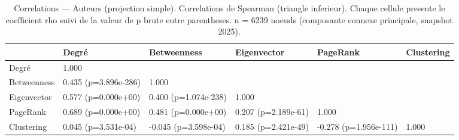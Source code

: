 \begin{table}
\caption{Correlations — Auteurs (projection simple). Correlations de Spearman (triangle inferieur). Chaque cellule presente le coefficient rho suivi de la valeur de p brute entre parentheses. n = 6239 noeuds (composante connexe principale, snapshot 2025).}
\label{tab:corr_heatmap_corr_auteurs_simple}
\begin{tabular}{llllll}
\toprule
 & Degré & Betweenness & Eigenvector & PageRank & Clustering \\
\midrule
Degré & 1.000 &  &  &  &  \\
Betweenness & 0.435
(p=3.896e-286) & 1.000 &  &  &  \\
Eigenvector & 0.577
(p=0.000e+00) & 0.400
(p=1.074e-238) & 1.000 &  &  \\
PageRank & 0.689
(p=0.000e+00) & 0.481
(p=0.000e+00) & 0.207
(p=2.189e-61) & 1.000 &  \\
Clustering & 0.045
(p=3.531e-04) & -0.045
(p=3.598e-04) & 0.185
(p=2.421e-49) & -0.278
(p=1.956e-111) & 1.000 \\
\bottomrule
\end{tabular}
\end{table}
